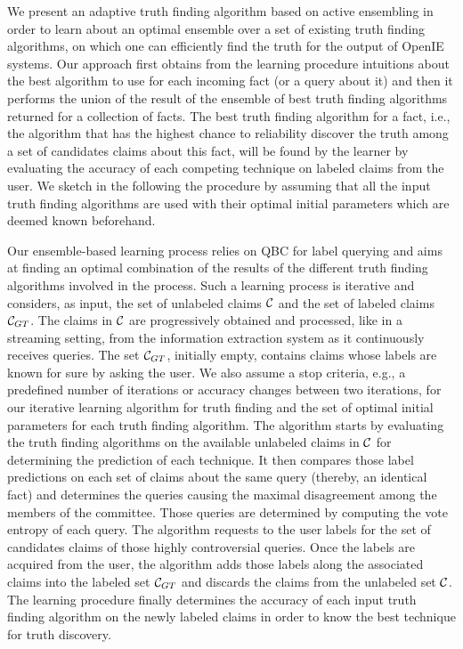 We present an adaptive truth finding algorithm based on active ensembling in order to learn about an optimal
ensemble over a set of existing truth finding algorithms, on which one can efficiently find the truth for the output 
of OpenIE systems. Our approach first obtains from the learning procedure intuitions about the best algorithm to use 
for each incoming fact (or a query about it) and then it performs the union of the result of the ensemble of best truth finding
algorithms returned for a collection of facts. The best truth finding algorithm for a fact, i.e., the algorithm that has the highest
chance to reliability discover the truth among a set of candidates claims about this fact, will be found by the learner by evaluating
the accuracy of each competing technique on labeled claims from the user. We sketch in the following the procedure by assuming that all
the input truth finding algorithms are used with their optimal initial parameters which are deemed known beforehand.

Our ensemble-based learning process relies on QBC for label querying and aims at finding an optimal combination of the results
of the different truth finding algorithms involved in the process. Such a learning process is iterative and considers, as input,
the set of unlabeled claims $\mathcal{C}{}$ and the set of labeled claims $\mathcal{C}_{GT}$. The claims in $\mathcal{C}{}$ are progressively
obtained and processed, like in a streaming setting, from the information extraction system as it continuously receives queries.
The set $\mathcal{C}_{GT}$, initially empty, contains
claims whose labels are known for sure by asking the user. We also assume a stop criteria, e.g., a predefined number of iterations 
or accuracy changes between two iterations, for our iterative learning algorithm for truth finding and the set of optimal initial
parameters for each truth finding algorithm.
The algorithm starts by evaluating the truth finding algorithms on the available unlabeled claims in $\mathcal{C}{}$ for determining
the prediction of each technique. It then compares those label predictions on each set of claims about the same query (thereby, an identical fact)
and determines the queries causing the maximal disagreement among the members of the committee. Those queries are determined by computing 
the vote entropy of each query. The algorithm requests to the user labels for the set of candidates claims of those highly controversial queries.
Once the labels are acquired from the user, the algorithm adds those labels along the associated claims into the labeled set $\mathcal{C}_{GT}$ and 
discards the claims from the unlabeled set $\mathcal{C}{}$. The learning procedure finally determines the accuracy of each input truth finding algorithm
on the newly labeled claims in order to know the best technique for truth discovery. 

